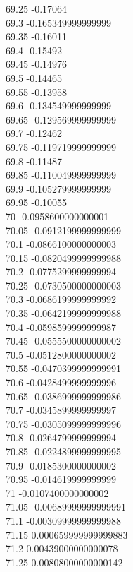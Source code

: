 {69.25	-0.17064\\
69.3	-0.165349999999999\\
69.35	-0.16011\\
69.4	-0.15492\\
69.45	-0.14976\\
69.5	-0.14465\\
69.55	-0.13958\\
69.6	-0.134549999999999\\
69.65	-0.129569999999999\\
69.7	-0.12462\\
69.75	-0.119719999999999\\
69.8	-0.11487\\
69.85	-0.110049999999999\\
69.9	-0.105279999999999\\
69.95	-0.10055\\
70	-0.0958600000000001\\
70.05	-0.0912199999999999\\
70.1	-0.0866100000000003\\
70.15	-0.0820499999999988\\
70.2	-0.0775299999999994\\
70.25	-0.0730500000000003\\
70.3	-0.0686199999999992\\
70.35	-0.0642199999999988\\
70.4	-0.0598599999999987\\
70.45	-0.0555500000000002\\
70.5	-0.0512800000000002\\
70.55	-0.0470399999999991\\
70.6	-0.0428499999999996\\
70.65	-0.0386999999999986\\
70.7	-0.0345899999999997\\
70.75	-0.0305099999999996\\
70.8	-0.0264799999999994\\
70.85	-0.0224899999999995\\
70.9	-0.0185300000000002\\
70.95	-0.014619999999999\\
71	-0.0107400000000002\\
71.05	-0.00689999999999991\\
71.1	-0.00309999999999988\\
71.15	0.000659999999999883\\
71.2	0.00439000000000078\\
71.25	0.00808000000000142\\
}
